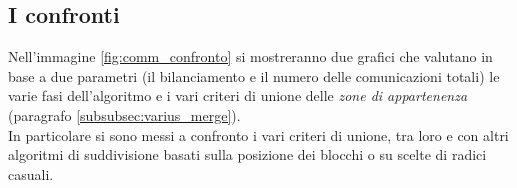 {\subsection{I confronti}
Nell'immagine \ref{fig:comm_confronto} si mostreranno due grafici che valutano in base a due parametri (il bilanciamento e il numero delle comunicazioni totali) le varie fasi dell'algoritmo e i vari criteri di unione delle \textit{zone di appartenenza} (paragrafo \ref{subsubsec:varius_merge}).\\
In particolare si sono messi a confronto i vari criteri di unione, tra loro e con altri algoritmi di suddivisione basati sulla posizione dei blocchi o su scelte di radici casuali.
\begin{figure}[H]
	\centering
	\begin{subfigure}{1.0\textwidth}

\end{subfigure}
\end{figure}}
